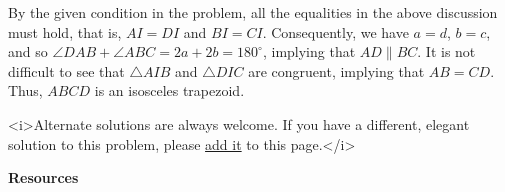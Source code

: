 \begin{enumerate}
 By the given condition in the problem, all the equalities in the above discussion must hold, that is, $AI = DI$ and $BI = CI$. Consequently, we have $a = d$, $b = c$, and so $\angle DAB + \angle ABC = 2a + 2b = 180^\circ$, implying that $AD\parallel BC$. It is not difficult to see that $\triangle AIB$ and $\triangle DIC$ are congruent, implying that $AB = CD$. Thus, $ABCD$ is an isosceles trapezoid.

 <i>Alternate solutions are always welcome. If you have a different, elegant solution to this problem, please \href{https://artofproblemsolving.com/wiki/index.php?title=2004\_USAMO\_Problems/Problem\_6&action=edit}{add it} to this page.</i>

 \textbf{Resources} 


\end{enumerate}